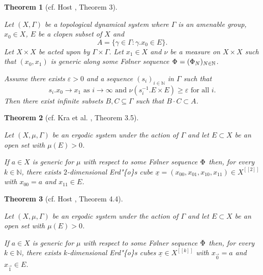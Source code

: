 \documentclass[
  british,
]{article}
\theoremstyle{plain}
\theoremstyle{plain}
\newtheorem{theorem}{Theorem}[section]
\theoremstyle{definition}
\theoremstyle{remark}
\newcommand{\AmenableGroupElement}{{\gamma}}
\newcommand{\Measure}{{\mu}}
\newcommand{\Folner}[1][\vphantom{}]{{\Phi}_{#1}}
\newcommand{\GroupAction}[2]{{#1}.{#2}}
\newcommand{\AmenableGroup}{{\Gamma}}
\newcommand{\GroupOperation}[2]{{#1}\cdot{#2}}
\begin{document}
\begin{theorem}[cf. Host , Theorem
3]\protect\hypertarget{thm-GenErdosConjDyn}{}\label{thm-GenErdosConjDyn}

Let \((X,\AmenableGroup)\) be a topological dynamical system where
\(\AmenableGroup\) is an amenable group, \(x_0\in X\), \(E\) be a clopen
subset of \(X\) and
\[A=\{\AmenableGroupElement\in\AmenableGroup:\GroupAction{\AmenableGroupElement}{x_0}\in E\}.\]
Let \(X\times X\) be acted upon by
\(\AmenableGroup\times\AmenableGroup\). Let \(x_1\in X\) and \(\nu\) be
a measure on \(X\times X\) such that \((x_0,x_1)\) is generic along some
Følner sequence \(\Folner=(\Folner[N])_{N\in\mathbb{N}}\).

Assume there exists \(\varepsilon>0\) and a sequence
\((s_i)_{i\in\mathbb{N}}\) in \(\AmenableGroup\) such that
\[\GroupAction{s_i}{x_0}\rightarrow x_1\text{ as }i\rightarrow\infty\text{ and }\nu(\GroupAction{s_i^{-1}}{E}\times E)\geq\varepsilon\text{ for all }i. \]
Then there exist infinite subsets \(B,C\subseteq \AmenableGroup\) such
that \(\GroupOperation{B}{C}\subset A\).

\end{theorem}

\begin{theorem}[cf. Kra et al. ,
Theorem
3.5]\protect\hypertarget{thm-GenErdosConjCube}{}\label{thm-GenErdosConjCube}

Let \((X,\Measure,\AmenableGroup)\) be an ergodic system under the
action of \(\AmenableGroup\) and let \(E\subset X\) be an open set with
\(\Measure(E)>0\).

If \(a\in X\) is generic for \(\Measure\) with respect to some Følner
sequence \(\Folner\) then, for every \(k\in\mathbb{N}\), there exists
\(2\)-dimensional Erd"\{o\}s cube
\(\underline{x}=(x_{00},x_{01},x_{10},x_{11})\in X^{[[2]]}\) with
\(x_{00}=a\) and \(x_{11}\in E\).

\end{theorem}

\begin{theorem}[cf. Host , Theorem
4.4]\protect\hypertarget{thm-GenNErdosConjCube}{}\label{thm-GenNErdosConjCube}

Let \((X,\Measure,\AmenableGroup)\) be an ergodic system under the
action of \(\AmenableGroup\) and let \(E\subset X\) be an open set with
\(\Measure(E)>0\).

If \(a\in X\) is generic for \(\Measure\) with respect to some Følner
sequence \(\Folner\) then, for every \(k\in\mathbb{N}\), there exists
\(k\)-dimensional Erd"\{o\}s cubes \(\underline{x}\in X^{[[k]]}\) with
\(x_{\vec{0}}=a\) and \(x_{\vec{1}}\in E\).

\end{theorem}
\end{document}
